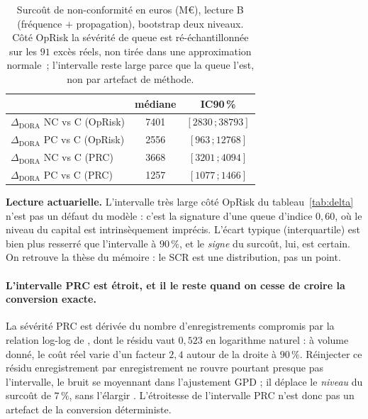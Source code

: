\begin{table}[htbp]\centering\small
\renewcommand{\arraystretch}{1.25}
\begin{tabular}{@{}l cc@{}}
\toprule
& médiane & IC90\,\% \\
\midrule
$\Delta_{\text{DORA}}$ NC vs C (OpRisk) & 7401 & $[2830\,;38793]$ \\
$\Delta_{\text{DORA}}$ PC vs C (OpRisk) & 2556 & $[963\,;12768]$  \\
$\Delta_{\text{DORA}}$ NC vs C (PRC)    & 3668 & $[3201\,;4094]$  \\
$\Delta_{\text{DORA}}$ PC vs C (PRC)    & 1257 & $[1077\,;1466]$  \\
\bottomrule
\end{tabular}
\caption{Surcoût de non-conformité en euros (M\euro), lecture B (fréquence $+$ propagation),
bootstrap deux niveaux. Côté OpRisk la sévérité de queue est ré-échantillonnée sur les
$91$ excès réels, non tirée dans une approximation
normale~; l'intervalle reste large parce que la queue l'est, non par artefact de méthode.}
\end{table}

\noindent \textbf{Lecture actuarielle.} L'intervalle très large côté OpRisk du
tableau~\ref{tab:delta} n'est pas un défaut
du modèle : c'est la signature d'une queue d'indice $0{,}60$, où le niveau du capital est
intrinsèquement imprécis. L'écart typique (interquartile) est bien plus resserré que
l'intervalle à $90\,\%$, et le \emph{signe} du surcoût, lui, est certain. On retrouve la thèse du
mémoire : le SCR est une distribution, pas un point.

\paragraph{L'intervalle PRC est étroit, et il le reste quand on cesse de croire la conversion
exacte.} La sévérité PRC est dérivée du nombre d'enregistrements compromis par la relation
log-log de \citet{jacobs2014}, dont le résidu vaut $0{,}523$ en logarithme naturel : à volume donné,
le coût réel varie d'un facteur $2{,}4$ autour de la droite à $90\,\%$. Réinjecter ce résidu
enregistrement par enregistrement ne rouvre pourtant presque pas l'intervalle, le bruit se
moyennant dans l'ajustement GPD ; il déplace le \emph{niveau} du surcoût de $7\,\%$, sans
l'élargir \matcomp. L'étroitesse de l'intervalle PRC n'est donc pas un artefact
de la conversion déterministe.

